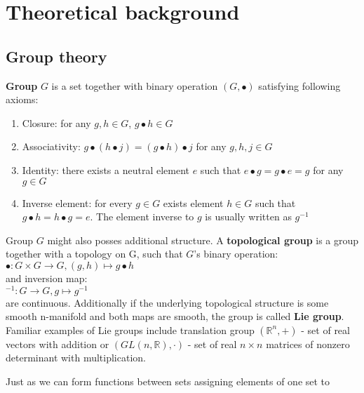 \section{Theoretical background}

\subsection{Group theory}
    \textbf{Group} $G$ is a set together with binary operation $\left(G, \bullet \right)$ satisfying
    following axioms:
    \begin{enumerate}
        \item Closure: for any $g, h \in G$, $g \bullet h \in G$
        \item Associativity:  $g\bullet \left(h \bullet j \right) =
                    \left(g \bullet h \right) \bullet j$ for any $g,h,j \in G$
        \item Identity: there exists a neutral element $e$ such that
                $e \bullet g = g \bullet e = g$ for any $g \in G$
        \item Inverse element: for every $g \in G$ exists element $h \in G$ such that
                $g \bullet h = h\bullet g = e$. The element inverse to $g$ is usually
                written as $g^{-1}$
    \end{enumerate}
    \par Group $G$ might also posses additional structure. A \textbf{topological group}
        is a group together with a topology on G, such that $G$'s binary operation:\\
        \hspace*{0.5cm} $\bullet: G \times G \to G, \left(g,h \right) \mapsto g\bullet h$ \\
        and inversion map: \\
        \hspace*{0.5cm} ${}^{-1}: G \to G, g \mapsto g^{-1}$ \\
        are continuous. Additionally if the underlying topological structure
        is some smooth n-manifold and both maps are smooth, the group is called
        \textbf{Lie group}. Familiar examples of Lie groups include translation group
        $\left( \mathbb{R}^n, + \right)$ - set of real vectors with addition or
        $\left(GL(n,\mathbb{R}), \cdot \right)$ - set of real $n \times n$ matrices of nonzero determinant
        with multiplication.\\\par
        Just as we can form functions between sets assigning elements of one set to
